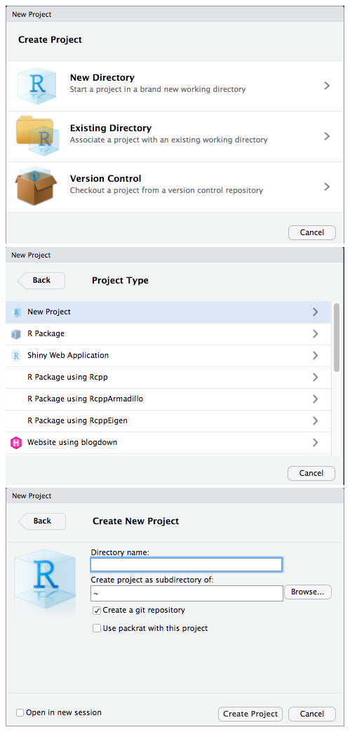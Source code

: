 \documentclass[12pt,letterpaperpaper,openany]{book}
\begin{document}
\includegraphics{img/Project2.png}
\includegraphics{img/Project3.png}
\includegraphics{img/Project1.png}
\end{document}
